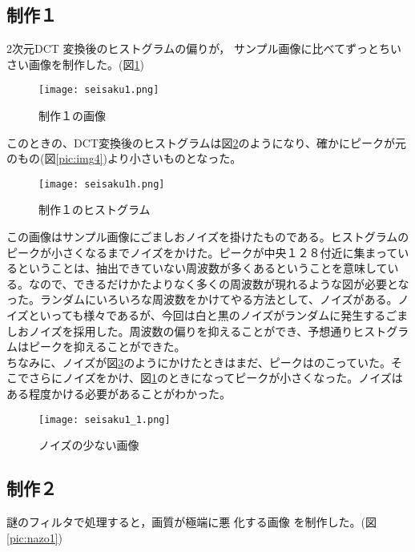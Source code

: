 \documentclass[a4j]{jsarticle}
\begin{document}
\subsection{制作１\label{cap:seisaku}}
2次元DCT 変換後のヒストグラムの偏りが，
サンプル画像に比べてずっとちいさい画像を制作した。(図\ref{pic:seisaku1})
\begin{figure}[H]
  \centering
  \texttt{[image: seisaku1.png]}
  \caption{制作１の画像}
  \label{pic:seisaku1}
\end{figure}
このときの、DCT変換後のヒストグラムは図\ref{pic:seisaku1h}のようになり、確かにピークが元のもの(図\ref{pic:img4})より小さいものとなった。
\begin{figure}[H]
  \centering
  \texttt{[image: seisaku1h.png]}
  \caption{制作１のヒストグラム}
  \label{pic:seisaku1h}
\end{figure}
この画像はサンプル画像にごましおノイズを掛けたものである。ヒストグラムのピークが小さくなるまでノイズをかけた。ピークが中央１２８付近に集まっているということは、抽出できていない周波数が多くあるということを意味している。なので、できるだけかたよりなく多くの周波数が現れるような図が必要となった。ランダムにいろいろな周波数をかけてやる方法として、ノイズがある。ノイズといっても様々であるが、今回は白と黒のノイズがランダムに発生するごましおノイズを採用した。周波数の偏りを抑えることができ、予想通りヒストグラムはピークを抑えることができた。\\
ちなみに、ノイズが図\ref{pic:seisaku1_1}のようにかけたときはまだ、ピークはのこっていた。そこでさらにノイズをかけ、図\ref{pic:seisaku1}のときになってピークが小さくなった。ノイズはある程度かける必要があることがわかった。
\begin{figure}[H]
  \centering
  \texttt{[image: seisaku1\_1.png]}
  \caption{ノイズの少ない画像}
  \label{pic:seisaku1_1}
\end{figure}

\subsection{制作２}
謎のフィルタで処理すると，画質が極端に悪
化する画像 を制作した。(図\ref{pic:nazo1})
\end{document}
